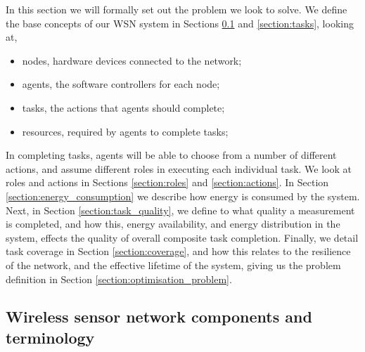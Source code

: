
In this section we will formally set out the problem we look to solve. We define the base concepts of our WSN system in Sections \ref{section:terminology} and \ref{section:tasks}, looking at,
\begin{itemize}
	\item nodes, hardware devices connected to the network;
	\item agents, the software controllers for each node;
	\item tasks, the actions that agents should complete;
	\item resources, required by agents to complete tasks; 
\end{itemize}
In completing tasks, agents will be able to choose from a number of different actions, and assume different roles in executing each individual task. We look at roles and actions in Sections \ref{section:roles} and \ref{section:actions}. In Section \ref{section:energy_consumption} we describe how energy is consumed by the system. Next, in Section \ref{section:task_quality}, we define to what quality a measurement is completed, and how this, energy availability, and energy distribution in the system, effects the quality of overall composite task completion. Finally, we detail task coverage in Section \ref{section:coverage}, and how this relates to the resilience of the network, and the effective lifetime of the system, giving us the problem definition in Section \ref{section:optimisation_problem}.

\begin{example}
\end{example}

\subsection{Wireless sensor network components and terminology}
\label{section:terminology}


